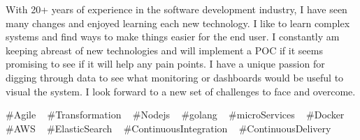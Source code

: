 

\begin{cvparagraph}


With 20+ years of experience in the software development industry, I have seen many changes and enjoyed learning each new
technology.  I like to learn complex systems and find ways to make things easier for the end user.  I constantly am keeping
abreast of new technologies and will implement a POC if it seems promising to see if it will help any pain points.  I have
a unique passion for digging through data to see what monitoring or dashboards would be useful to visual the system.
I look forward to a new set of challenges to face and overcome.


\end{cvparagraph}
\begin{cvtechnologies}
 \#Agile ~
 \#Transformation ~
 \#Nodejs ~
 \#golang ~
 \#microServices ~
 \#Docker ~
 \#AWS ~
 \#ElasticSearch ~
 \#ContinuousIntegration ~
 \#ContinuousDelivery ~
\end{cvtechnologies}
